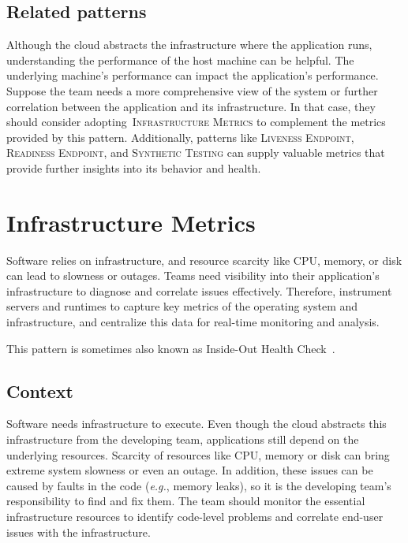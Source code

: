 \documentclass[runningheads]{llncs}
\begin{document}
\subsection{Related patterns}
Although the cloud abstracts the infrastructure where the application runs, understanding the performance of the host machine can be helpful. The underlying machine's performance can impact the application's performance. Suppose the team needs a more comprehensive view of the system or further correlation between the application and its infrastructure. In that case, they should consider adopting~\textsc{Infrastructure Metrics} to complement the metrics provided by this pattern. Additionally, patterns like \textsc{Liveness Endpoint}, \textsc{Readiness Endpoint}, and \textsc{Synthetic Testing} can supply valuable metrics that provide further insights into its behavior and health.


\section{Infrastructure Metrics}\label{pat:infrastructure-metrics} 
Software relies on infrastructure, and resource scarcity like CPU, memory, or disk can lead to slowness or outages. Teams need visibility into their application's infrastructure to diagnose and correlate issues effectively. Therefore, instrument servers and runtimes to capture key metrics of the operating system and infrastructure, and centralize this data for real-time monitoring and analysis.

This pattern is sometimes also known as Inside-Out Health Check~\cite{Gupta-Patterns-2022}.

\subsection{Context}
Software needs infrastructure to execute. Even though the cloud abstracts this infrastructure from the developing team, applications still depend on the underlying resources. Scarcity of resources like CPU, memory or disk can bring extreme system slowness or even an outage. In addition, these issues can be caused by faults in the code (\textit{e.g.}, memory leaks), so it is the developing team's responsibility to find and fix them. The team should monitor the essential infrastructure resources to identify code-level problems and correlate end-user issues with the infrastructure.
\end{document}
